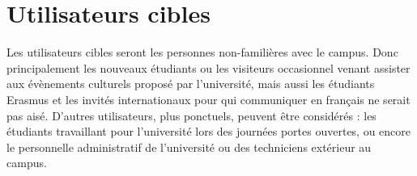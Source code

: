 \section{Utilisateurs cibles}

Les utilisateurs cibles seront les personnes non-familières avec le campus. Donc principalement les  nouveaux étudiants ou les visiteurs occasionnel venant assister aux évènements culturels proposé par l’université, mais aussi les étudiants Erasmus et les invités internationaux pour qui communiquer en français ne serait pas aisé. D’autres utilisateurs, plus ponctuels, peuvent être considérés : les étudiants travaillant pour l’université lors des journées portes ouvertes, ou encore le personnelle administratif de l’université ou des techniciens extérieur au campus.



